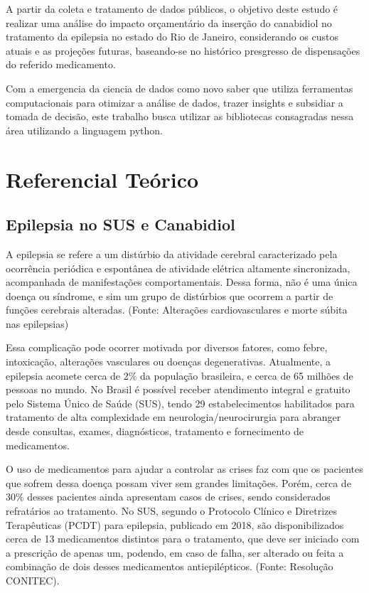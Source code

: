 \documentclass[article,a4paper,12pt,brazil,sumario=tradicional]{abntex2}
\begin{document}
A partir da coleta e tratamento de dados públicos, o objetivo deste estudo é realizar uma análise do impacto orçamentário da inserção do canabidiol no tratamento da epilepsia no estado do Rio de Janeiro, considerando os custos atuais e as projeções futuras, baseando-se no histórico presgresso de dispensações do referido medicamento.

Com a emergencia da ciencia de dados como novo saber que utiliza ferramentas computacionais para otimizar a análise de dados, trazer insights e subsidiar a tomada de decisão, este trabalho busca utilizar as bibliotecas consagradas nessa área utilizando a linguagem python.

\section{Referencial Teórico}

\subsection{Epilepsia no SUS e Canabidiol}
A epilepsia se refere a um distúrbio da atividade cerebral caracterizado pela ocorrência periódica e espontânea de atividade elétrica altamente sincronizada, acompanhada de manifestações comportamentais. Dessa forma, não é uma única doença ou síndrome, e sim um grupo de distúrbios que ocorrem a partir de funções cerebrais alteradas. (Fonte: Alterações cardiovasculares e morte súbita nas epilepsias)

Essa complicação pode ocorrer motivada por diversos fatores, como febre, intoxicação, alterações vasculares ou doenças degenerativas. Atualmente, a epilepsia acomete cerca de 2\% da população brasileira, e cerca de 65 milhões de pessoas no mundo. No Brasil é possível receber atendimento integral e gratuito pelo Sistema Único de Saúde (SUS), tendo 29 estabelecimentos habilitados para tratamento de alta complexidade em neurologia/neurocirurgia para abranger desde consultas, exames, diagnósticos, tratamento e fornecimento de medicamentos.

O uso de medicamentos para ajudar a controlar as crises faz com que os pacientes que sofrem dessa doença possam viver sem grandes limitações. Porém, cerca de 30\% desses pacientes ainda apresentam casos de crises, sendo considerados refratários ao tratamento. No SUS, segundo o Protocolo Clínico e Diretrizes Terapêuticas (PCDT) para epilepsia, publicado em 2018, são disponibilizados cerca de 13 medicamentos distintos para o tratamento, que deve ser iniciado com a prescrição de apenas um, podendo, em caso de falha, ser alterado ou feita a combinação de dois desses medicamentos antiepilépticos. (Fonte: Resolução CONITEC).
\end{document}
